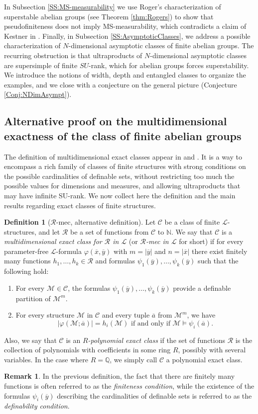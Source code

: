 \documentclass[11pt]{amsart}
\theoremstyle{definition}
\newtheorem{rmk}[prop]{Remark}
\newtheorem{definicion}[prop]{Definition}
\newcommand{\bd}{\begin{definicion}}
\newcommand{\ed}{\end{definicion}}
\newcommand{\brmk}{\begin{rmk}}
\newcommand{\ermk}{\end{rmk}}
\newcommand{\benum}{\begin{enumerate}}
\newcommand{\eenum}{\end{enumerate}}
\newcommand{\ov}[1]{\overline{#1}}
\newcommand{\Le}{\mathcal{L}}
\begin{document}
In Subsection \ref{SS:MS-measurability} we use Roger's characterization of superstable abelian groups (see Theorem \ref{thm:Rogers}) to show that pseudofiniteness does not imply MS-measurability, which contradicts a claim of Kestner in \cite[Remark 4.14]{Kestner2014}. Finally, in Subsection \ref{SS:AsymptoticClasses}, we address a possible characterization of $N$-dimensional asymptotic classes of finite abelian groups. The recurring obstruction is that ultraproducts of $N$-dimensional asymptotic classes are supersimple of finite $SU$-rank, which for abelian groups forces superstability. We introduce the notions of width, depth and entangled classes to organize the examples, and we close with a conjecture on the general picture (Conjecture \ref{Conj:NDimAsympt}).
\subsection{Alternative proof on the multidimensional exactness of the class of finite abelian groups}\label{SS:MEC}
The definition of multidimensional exact classes appear in \cite{Wolf-MEC} and \cite{AMSW}. It is a way to encompass a rich family of classes of finite structures with strong conditions on the possible cardinalities of definable sets, without restricting too much the possible values for dimensions and measures, and allowing ultraproducts that may have infinite SU-rank. We now collect here the definition and the main results regarding exact classes of finite structures.
\bd [$\mathcal{R}$-mec, alternative definition] \label{Def:MEC} Let $\mathcal{C}$ be a class of finite $\Le$-structures, and let $\mathcal{R}$ be a set of functions from $\mathcal{C}$ to $\mathbb{N}$. We say that $\mathcal{C}$ is a \emph{multidimensional exact class for $\mathcal{R}$ in $\Le$} (or \emph{$\mathcal{R}$-mec in $\mathcal{L}$} for short) if for every parameter-free $\Le$-formula $\varphi(\ov{x},\ov{y})$ with $m=|\ov{y}|$ and $n=|\ov{x}|$ there exist finitely many functions $h_1,\ldots,h_k\in \mathcal{R}$ and formulas $\psi_1(\ov{y}),\ldots,\psi_k(\ov{y})$ such that the following hold:
\benum
\item For every $\mathcal{M}\in \mathcal{C}$, the formulas $\psi_1(\ov{y}),\ldots,\psi_k(\ov{y})$ provide a definable partition of $\mathcal{M}^m$.
\item For every structure $\mathcal{M}$ in $\mathcal{C}$ and every tuple $\ov{a}$ from $\mathcal{M}^m$, we have \[|\varphi(\mathcal{M};\ov{a})|=h_i(\mathcal{M}) \text{\ if and only if\ }\mathcal{M}\models \psi_i(\ov{a}).\]
\eenum
Also, we say that $\mathcal{C}$ is an \emph{$R$-polynomial exact class} if the set of functions $\mathcal{R}$ is the collection of polynomials with coefficients in some ring $R$, possibly with several variables. In the case where $R=\mathbb{Q}$, we simply call $\mathcal{C}$ a polynomial exact class.
\ed
\brmk In the previous definition, the fact that there are finitely many functions is often referred to as the \emph{finiteness condition}, while the existence of the formulas $\psi_i(\ov{y})$ describing the cardinalities of definable sets is referred to as the \emph{definability condition}. 
\ermk
\end{document}

